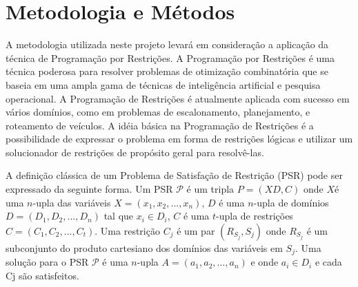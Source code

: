 


\section{Metodologia e Métodos}

A metodologia utilizada neste projeto levará em consideração a aplicação da técnica de Programação por Restrições. A Programação por Restrições é uma técnica poderosa para resolver problemas de otimização combinatória que se baseia em uma ampla gama de técnicas de inteligência artificial e pesquisa operacional. A Programação de Restrições é atualmente aplicada com sucesso em vários domínios, como em problemas de escalonamento, planejamento, e roteamento de veículos. A idéia básica na Programação de Restrições é a possibilidade de expressar o problema em forma de restrições lógicas e utilizar um solucionador de restrições de propósito geral para resolvê-las.


A definição clássica de um Problema de Satisfação de Restrição (PSR) pode ser expressado da seguinte forma. Um PSR $\mathcal{P}$ é um tripla $P = (X D, C)$ onde $X $é uma $n$-upla das variáveis $X = (x_1, x_2, ..., x_n)$, $D$ é uma $n$-upla de domínios $D = (D_1, D_2, ..., D_n)$ tal que $x_i \in D_i$, $C$ é uma $t$-upla de restrições $C = (C_1, C_2,. . . , C_t)$. Uma restrição $C_j$ é um par $(R_{S_j}, S_j)$ onde $R_{S_j}$ é um subconjunto do produto cartesiano dos domínios das variáveis em $S_j$. Uma solução para o PSR $\mathcal{P}$ é uma $n$-upla $A = (a_1, a_2, ...,a_n)$ e onde $a_i \in D_i$ e cada Cj são satisfeitos.

